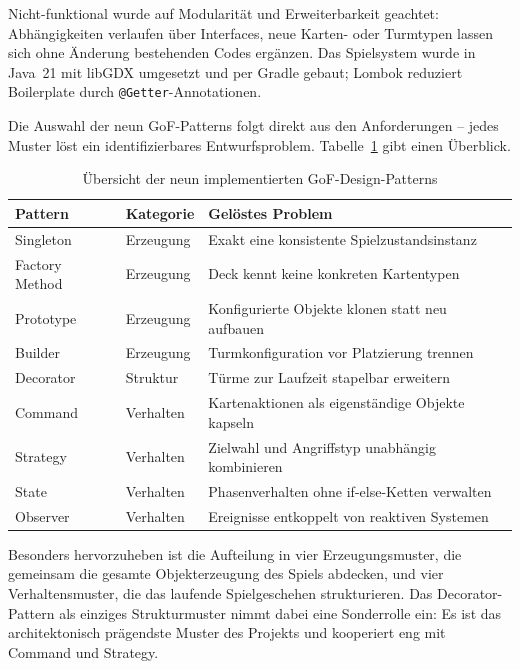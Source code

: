 Nicht-funktional wurde auf Modularität und Erweiterbarkeit geachtet:
Abhängigkeiten verlaufen über Interfaces, neue Karten- oder Turmtypen lassen sich
ohne Änderung bestehenden Codes ergänzen. Das Spielsystem
wurde in Java~21 mit libGDX umgesetzt und per Gradle gebaut;
Lombok reduziert Boilerplate durch \texttt{@Getter}-Annotationen.

Die Auswahl der neun GoF-Patterns folgt direkt aus den Anforderungen -- jedes
Muster löst ein identifizierbares Entwurfsproblem. Tabelle~\ref{tab:patterns}
gibt einen Überblick.

\begin{table}[H]
\centering
\begin{tabular}{llp{7.5cm}}
\toprule
\textbf{Pattern} & \textbf{Kategorie} & \textbf{Gelöstes Problem} \\
\midrule
Singleton      & Erzeugung & Exakt eine konsistente Spielzustandsinstanz \\
Factory Method & Erzeugung & Deck kennt keine konkreten Kartentypen \\
Prototype      & Erzeugung & Konfigurierte Objekte klonen statt neu aufbauen \\
Builder        & Erzeugung & Turmkonfiguration vor Platzierung trennen \\
Decorator      & Struktur  & Türme zur Laufzeit stapelbar erweitern \\
Command        & Verhalten & Kartenaktionen als eigenständige Objekte kapseln \\
Strategy       & Verhalten & Zielwahl und Angriffstyp unabhängig kombinieren \\
State          & Verhalten & Phasenverhalten ohne if-else-Ketten verwalten \\
Observer       & Verhalten & Ereignisse entkoppelt von reaktiven Systemen \\
\bottomrule
\end{tabular}
\caption{Übersicht der neun implementierten GoF-Design-Patterns}
\label{tab:patterns}
\end{table}


Besonders hervorzuheben ist die Aufteilung in vier Erzeugungsmuster, die gemeinsam
die gesamte Objekterzeugung des Spiels abdecken, und vier Verhaltensmuster, die
das laufende Spielgeschehen strukturieren. Das Decorator-Pattern als einziges
Strukturmuster nimmt dabei eine Sonderrolle ein: Es ist das architektonisch
prägendste Muster des Projekts und kooperiert eng mit Command und Strategy.
